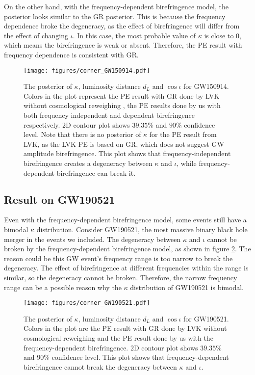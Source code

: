 \documentclass[aps,prd,twocolumn,superscriptaddress,preprintnumbers,floatfix,nofootinbib]{revtex4-2}
\begin{document}
On the other hand, with the frequency-dependent birefringence model, the posterior looks similar to the GR posterior.
This is because the frequency dependence broke the degeneracy, as the effect of birefringence will differ from the effect of changing $\iota$.
In this case, the most probable value of $\kappa$ is close to $0$, which means the birefringence is weak or absent.
Therefore, the PE result with frequency dependence is consistent with GR.

\begin{figure}[h]
    \texttt{[image: figures/corner\_GW150914.pdf]}
    \caption{
        The posterior of $\kappa$, luminosity distance $d_L$ and $\cos{\iota}$ for GW150914.
        Colors in the plot represent the PE result with GR done by LVK without cosmological reweighing \citep{GWTC-2.1, GWTC-3}, the PE results done by us with both frequency independent and dependent birefringence respectively.
        2D contour plot shows $39.35\%$ and $90\%$ confidence level.
        Note that there is no posterior of $\kappa$ for the PE result from LVK, as the LVK PE is based on GR, which does not suggest GW amplitude birefringence.
        This plot shows that frequency-independent birefringence creates a degeneracy between $\kappa$ and $\iota$, while frequency-dependent birefringence can break it.
    }
    \label{fig:corner_GW150914}
\end{figure}

\subsection{Result on GW190521}
Even with the frequency-dependent birefringence model, some events still have a bimodal $\kappa$ distribution.
Consider GW190521, the most massive binary black hole merger in the events we included.
The degeneracy between $\kappa$ and $\iota$ cannot be broken by the frequency-dependent birefringence model, as shown in figure \ref{fig:corner_GW190521}.
The reason could be this GW event's frequency range is too narrow to break the degeneracy.
The effect of birefringence at different frequencies within the range is similar, so the degeneracy cannot be broken.
Therefore, the narrow frequency range can be a possible reason why the $\kappa$ distribution of GW190521 is bimodal.

\begin{figure}[h]
    \texttt{[image: figures/corner\_GW190521.pdf]}
    \caption{
        The posterior of $\kappa$, luminosity distance $d_L$ and $\cos{\iota}$ for GW190521.
        Colors in the plot are the PE result with GR done by LVK without cosmological reweighing \citep{GWTC-2.1, GWTC-3} and the PE result done by us with the frequency-dependent birefringence.
        2D contour plot shows $39.35\%$ and $90\%$ confidence level.
        This plot shows that frequency-dependent birefringence cannot break the degeneracy between $\kappa$ and $\iota$.
    }
    \label{fig:corner_GW190521}
\end{figure}
\end{document}
